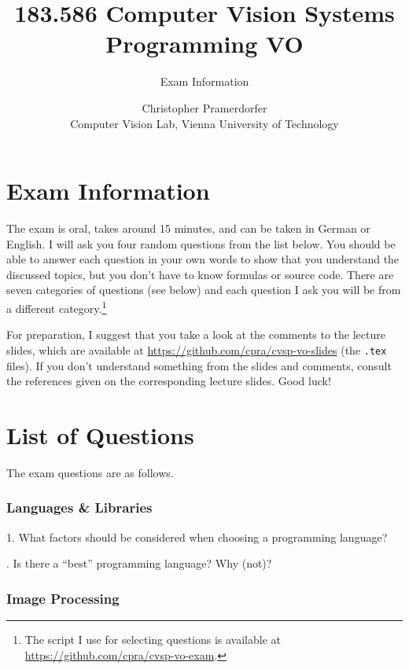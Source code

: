 \documentclass[paper=A4,11pt]{scrartcl}
\begin{document}
\title{\Large 183.586 Computer Vision Systems Programming VO}
\subtitle{Exam Information}
\author{Christopher Pramerdorfer\\\small Computer Vision Lab, Vienna University of Technology}
\maketitle

\section{Exam Information} %
\label{sec:exam_information}

The exam is oral, takes around 15 minutes, and can be taken in German or English. I will ask you four random questions from the list below. You should be able to answer each question in your own words to show that you understand the discussed topics, but you don't have to know formulas or source code. There are seven categories of questions (see below) and each question I ask you will be from a different category.\footnote{The script I use for selecting questions is available at \url{https://github.com/cpra/cvsp-vo-exam}.}

For preparation, I suggest that you take a look at the comments to the lecture slides, which are available at \url{https://github.com/cpra/cvsp-vo-slides} (the \texttt{.tex} files). If you don't understand something from the slides and comments, consult the references given on the corresponding lecture slides. Good luck!



\section{List of Questions} %
\label{sec:list_of_questions}

The exam questions are as follows.

\subsubsection*{Languages \& Libraries} %

1. What factors should be considered when choosing a programming language?

\bigskip{}. Is there a \enquote{best} programming language? Why (not)?


\subsubsection*{Image Processing} %
\end{document}
